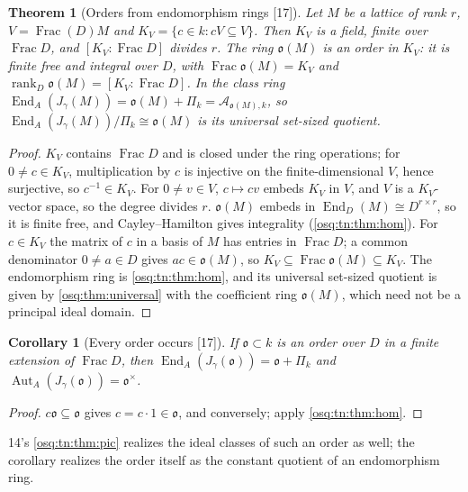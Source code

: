\documentclass[11pt,letterpaper]{article}
\numberwithin{equation}{section}
\newtheorem{theorem}{Theorem}[section]
\newtheorem{corollary}[corollary]{Corollary}
\theoremstyle{definition}
\theoremstyle{remark}
\theoremstyle{plain}
\newcommand{\A}{\mathcal A}          %
\newcommand{\End}{\operatorname{End}}
\newcommand{\Frac}{\operatorname{Frac}}
\newcommand{\rk}{\operatorname{rank}}
\newcommand{\src}[1]{\textup{\textsf{[#1]}}}
\begin{document}
\begin{theorem}[Orders from endomorphism rings \src{17}]\label{osq:rel:thm:order}
Let $M$ be a lattice of rank $r$, $V=\Frac(D)M$ and $K_V=\{c\in k:cV\subseteq V\}$. Then $K_V$ is a field, finite over $\Frac D$, and
$[K_V:\Frac D]$ divides $r$. The ring $\mathfrak o(M)$ is an order in $K_V$: it is finite free and integral over $D$, with
$\Frac\mathfrak o(M)=K_V$ and $\rk_D\mathfrak o(M)=[K_V:\Frac D]$. In the class ring $\End_A(J_\gamma(M))=\mathfrak o(M)+\Pi_k=\A_{\mathfrak o(M),k}$,
so $\End_A(J_\gamma(M))/\Pi_k\cong\mathfrak o(M)$ is its universal set-sized quotient.
\end{theorem}
\begin{proof}
$K_V$ contains $\Frac D$ and is closed under the ring operations; for $0\ne c\in K_V$, multiplication by $c$ is injective on the
finite-dimensional $V$, hence surjective, so $c^{-1}\in K_V$. For $0\ne v\in V$, $c\mapsto cv$ embeds $K_V$ in $V$, and $V$ is a
$K_V$-vector space, so the degree divides $r$. $\mathfrak o(M)$ embeds in $\End_D(M)\cong D^{r\times r}$, so it is finite free, and
Cayley--Hamilton gives integrality (\cref{osq:tn:thm:hom}). For $c\in K_V$ the matrix of $c$ in a basis of $M$ has entries in $\Frac D$;
a common denominator $0\ne a\in D$ gives $ac\in\mathfrak o(M)$, so $K_V\subseteq\Frac\mathfrak o(M)\subseteq K_V$. The endomorphism
ring is \cref{osq:tn:thm:hom}, and its universal set-sized quotient is given by \cref{osq:thm:universal} with the coefficient ring
$\mathfrak o(M)$, which need not be a principal ideal domain.
\end{proof}

\begin{corollary}[Every order occurs \src{17}]\label{osq:rel:cor:realize}
If $\mathfrak o\subset k$ is an order over $D$ in a finite extension of $\Frac D$, then $\End_A(J_\gamma(\mathfrak o))=\mathfrak o+\Pi_k$ and
$\operatorname{Aut}_A(J_\gamma(\mathfrak o))=\mathfrak o^\times$.
\end{corollary}
\begin{proof}
$c\mathfrak o\subseteq\mathfrak o$ gives $c=c\cdot1\in\mathfrak o$, and conversely; apply \cref{osq:tn:thm:hom}.
\end{proof}

14's \cref{osq:tn:thm:pic} realizes the ideal classes of such an order as well; the corollary realizes the order itself as the
constant quotient of an endomorphism ring.
\end{document}
